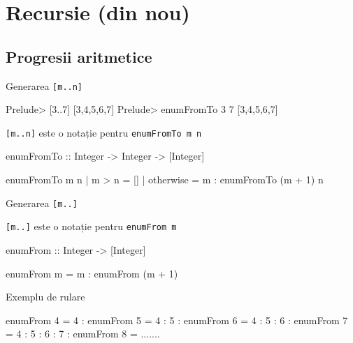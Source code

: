 \documentclass[xcolor=pdftex,romanian,colorlinks]{beamer}
\begin{document}
\section{Recursie (din nou)}
\subsection{Progresii aritmetice}
\begin{frame}[fragile]{Generarea \lstinline$[m..n]$}
\begin{asciihs}
Prelude> [3..7]
[3,4,5,6,7]
Prelude> enumFromTo 3 7
[3,4,5,6,7]
\end{asciihs}

\lstinline$[m..n]$ este o notație pentru  \lstinline$enumFromTo m n$
\begin{asciihs}
enumFromTo :: Integer -> Integer -> [Integer]
\end{asciihs}
\vspace{-2ex}
\begin{asciihs}
enumFromTo m n | m > n     = []
               | otherwise = m : enumFromTo (m + 1) n
\end{asciihs}
\end{frame}

\begin{frame}[fragile]{Generarea \lstinline$[m..]$}

\lstinline$[m..]$ este o notație pentru  \lstinline$enumFrom m$
\begin{asciihs}
enumFrom :: Integer -> [Integer]
\end{asciihs}
\vspace{-2ex}
\begin{asciihs}
enumFrom m = m : enumFrom (m + 1)
\end{asciihs}

\begin{block}{Exemplu de rulare}
\begin{asciihs}
enumFrom 4 
  = 4 : enumFrom 5
  = 4 : 5 : enumFrom 6
  = 4 : 5 : 6 : enumFrom 7
  = 4 : 5 : 6 : 7 : enumFrom 8 
  = .......
\end{asciihs}
\end{block}
\end{frame}
\end{document}
